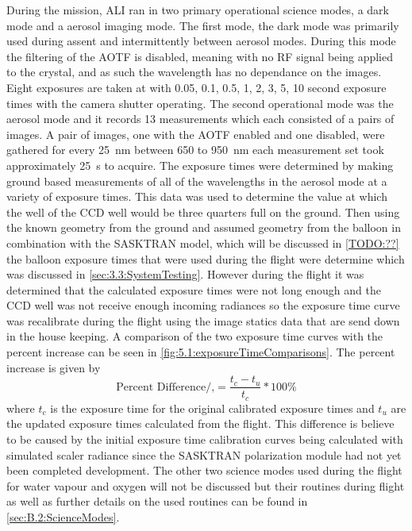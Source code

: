 During the mission, ALI ran in two primary operational science modes, a dark mode and a aerosol imaging mode. The first mode, the dark mode was primarily used during assent and intermittently between aerosol modes. During this mode the filtering of the AOTF is disabled, meaning with no RF signal being applied to the crystal, and as such the wavelength has no dependance on the images. Eight exposures are taken at with 0.05, 0.1, 0.5, 1, 2, 3, 5, 10 second exposure times with the camera shutter operating. The second operational mode was the aerosol mode and it records 13 measurements which each consisted of a pairs of images. A pair of images, one with the AOTF enabled and one disabled, were gathered for every 25~nm between 650 to 950~nm each measurement set took approximately 25~s to acquire. The exposure times were determined by making ground based measurements of all of the wavelengths in the aerosol mode at a variety of exposure times. This data was used to determine the value at which the well of the CCD well would be three quarters full on the ground. Then using the known geometry from the ground and assumed geometry from the balloon in combination with the SASKTRAN model, which will be discussed in \autoref{TODO:??} the balloon exposure times that were used during the flight were determine which was discussed in \autoref{sec:3.3:SystemTesting}. However during the flight it was determined that the calculated exposure times were not long enough and the CCD well was not receive enough incoming radiances so the exposure time curve was recalibrate during the flight using the image statics data that are send down in the house keeping. A comparison of the two exposure time curves with the percent increase can be seen in \autoref{fig:5.1:exposureTimeComparisons}. The percent increase is given by 
\begin{equation}
    \text{Percent Difference/,} = \frac{t_{c}-t_{u}}{t_{c}}*100\%
\end{equation}
where $t_{c}$ is the exposure time for the original calibrated exposure times and $t_{u}$ are the updated exposure times calculated from the flight. This difference is believe to be caused by the initial exposure time calibration curves being calculated with simulated scaler radiance since the SASKTRAN polarization module had not yet been completed development. The other two science modes used during the flight for water vapour and oxygen will not be discussed but their routines during flight as well as further details on the used routines can be found in \autoref{sec:B.2:ScienceModes}. %


